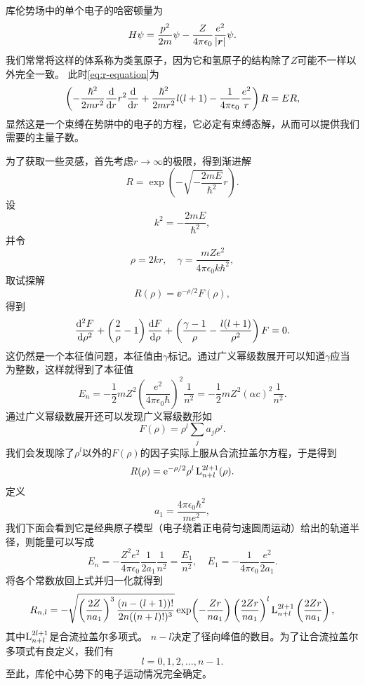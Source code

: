 库伦势场中的单个电子的哈密顿量为
\begin{equation}
    {H} \psi = \frac{{p}^2}{2m} \psi - \frac{Z}{4\pi \epsilon_0} \frac{e^2}{\abs{\vb*{r}}} \psi.
    \label{eq:columb-electron-hamiltonian}
\end{equation}
我们常常将这样的体系称为类氢原子，因为它和氢原子的结构除了$Z$可能不一样以外完全一致。
此时\eqref{eq:r-equation}为
\[
    \left( - \frac{\hbar^2}{2m r^2} \dv{r} r^2 \dv{r} + \frac{\hbar^2}{2m r^2} l(l+1) - \frac{1}{4\pi \epsilon_0} \frac{e^2}{r} \right) R = E R,
\]
显然这是一个束缚在势阱中的电子的方程，它必定有束缚态解，从而可以提供我们需要的主量子数。

为了获取一些灵感，首先考虑$r\to \infty$的极限，得到渐进解
\[
    R = \exp(- \sqrt{- \frac{2 m E}{\hbar^2}} r).
\]
设
\[
    k^2 = - \frac{2 m E}{\hbar^2},
\]
并令
\[
    \rho = 2 k r, \quad \gamma = \frac{m Z e^2}{4\pi \epsilon_0 k \hbar^2}, 
\]
取试探解
\[
    R(\rho) = \ee^{- \rho / 2} F(\rho),
\]
得到
\[
    \dv[2]{F}{\rho} + \left( \frac{2}{\rho} - 1 \right) \dv{F}{\rho} + \left( \frac{\gamma - 1}{\rho} - \frac{l(l+1)}{\rho^2} \right) F = 0.
\]
这仍然是一个本征值问题，本征值由$\gamma$标记。通过广义幂级数展开可以知道$\gamma$应当为整数，这样就得到了本征值
\begin{equation}
    E_n = - \frac{1}{2} m Z^2 \left( \frac{e^2}{4\pi \epsilon_0 \hbar} \right)^2 \frac{1}{n^2} = - \frac{1}{2} m Z^2 (\alpha c)^2 \frac{1}{n^2}.
\end{equation}
通过广义幂级数展开还可以发现广义幂级数形如
\[
    F(\rho) = \rho^l \sum_j a_j \rho^j.
\]
我们会发现除了$\rho^l$以外的$F(\rho)$的因子实际上服从合流拉盖尔方程，于是得到
\[
    R(\rho) = \mathrm{e}^{-\rho/2} \rho^l \operatorname{L}_{n+l}^{2l+1}(\rho).
\]
定义
\begin{equation}
    a_1 = \frac{4\pi \epsilon_0 \hbar^2}{m e^2},
\end{equation}
我们下面会看到它是经典原子模型（电子绕着正电荷匀速圆周运动）给出的轨道半径，则能量可以写成
\begin{equation}
    E_n = - \frac{Z^2 e^2}{4 \pi \epsilon_0 } \frac{1}{2 a_1} \frac{1}{n^2} = \frac{E_1}{n^2}, \quad E_1 = - \frac{1}{4\pi \epsilon_0} \frac{e^2}{2 a_1}.
    \label{eq:hydrogen-energy}
\end{equation}
将各个常数放回上式并归一化就得到
\begin{equation}
    R_{n, l} = - \sqrt{\left( \frac{2 Z}{n a_1} \right)^3 \frac{(n-(l+1))!}{2n ((n + l)!)^3}} \exp(- \frac{Z r}{n a_1}) \left( \frac{2 Z r}{n a_1} \right)^l \operatorname{L}_{n+l}^{2l+1}\left(\frac{2 Z r}{n a_1}\right),
\end{equation}
其中$\operatorname{L}_{n+l}^{2l+1}$是合流拉盖尔多项式。
$n-l$决定了径向峰值的数目。为了让合流拉盖尔多项式有良定义，我们有
\begin{equation}
    l = 0, 1, 2, \ldots, n-1.
\end{equation}
至此，库伦中心势下的电子运动情况完全确定。

